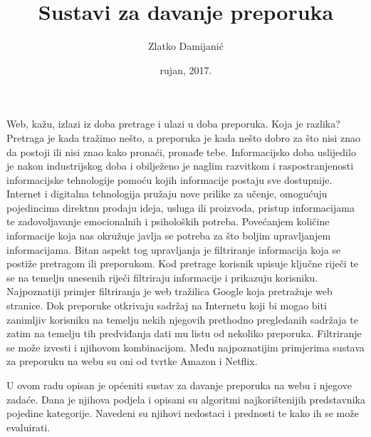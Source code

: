 \documentclass[a4paper,oneside,12pt]{memoir} %
\title{Sustavi za davanje preporuka}
\author{Zlatko Damijanić}
\date{rujan, 2017.}  %
\begin{document}
\renewcommand\thelstlisting{\arabic{chapter}.\arabic{lstlisting}.}

\frontmatter %
\begin{intro}
Web, kažu, izlazi iz doba pretrage i ulazi u doba preporuka. Koja je razlika? Pretraga je kada tražimo nešto, a preporuka je kada nešto dobro za što nisi znao da postoji ili nisi znao kako pronaći, pronađe tebe. Informacijsko doba uslijedilo je nakon industrijskog doba i obilježeno je naglim razvitkom i raspostranjenosti informacijske tehnologije pomoću kojih informacije postaju sve dostupnije. Internet i digitalna tehnologija pružaju nove prilike za učenje, omogućuju pojedincima direktnu prodaju ideja, usluga ili proizvoda, pristup informacijama te zadovoljavanje emocionalnih i psiholoških potreba. Povećanjem količine informacije koja nas okružuje javlja se potreba za što boljim upravljanjem informacijama. Bitan aspekt tog upravljanja je filtriranje informacija koja se postiže pretragom ili preporukom. Kod pretrage korisnik upisuje ključne riječi te se na temelju unesenih riječi filtriraju informacije i prikazuju korisniku. Najpoznatiji primjer filtriranja je web tražilica Google koja pretražuje web stranice. Dok preporuke otkrivaju sadržaj na Internetu koji bi mogao biti zanimljiv korisniku na temelju nekih njegovih prethodno pregledanih sadržaja te zatim na temelju tih predviđanja dati mu listu od nekoliko preporuka. Filtriranje se može izvesti i njihovom kombinacijom. Među najpoznatijim primjerima sustava za  preporuku na webu su oni od tvrtke Amazon i Netflix.
\par 
U ovom radu opisan je općeniti sustav za davanje preporuka na webu i njegove zadaće. Dana je njihova podjela i opisani su algoritmi najkorištenijih predstavnika pojedine kategorije. Navedeni su njihovi nedostaci i prednosti te kako ih se može evaluirati.
\end{intro}
\end{document}
